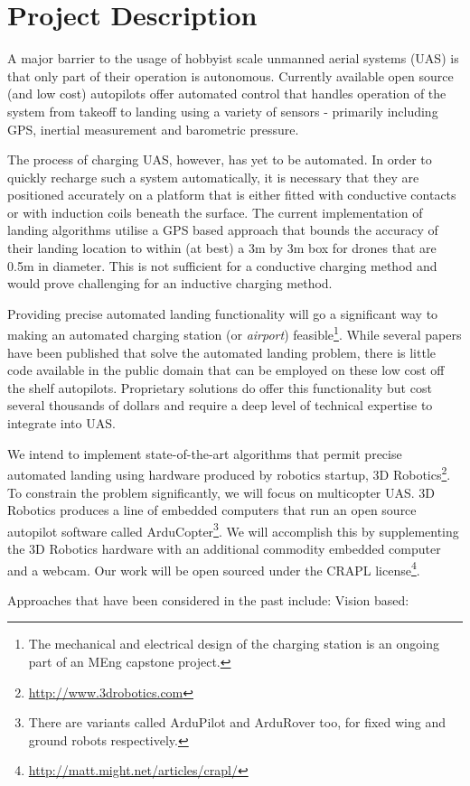 \section*{Project Description}

A major barrier to the usage of hobbyist scale unmanned aerial systems (UAS) is
that only part of their operation is autonomous. Currently available open
source (and low cost) autopilots offer  automated control that handles
operation of the system from takeoff to landing using a variety of sensors -
primarily including GPS, inertial measurement and barometric pressure. 

The process of charging UAS, however, has yet to be automated. In order to
quickly recharge such a system automatically, it is necessary that they are
positioned accurately on a platform that is either fitted with conductive
contacts or with induction coils beneath the surface. The current
implementation of landing algorithms utilise a GPS based approach that bounds
the accuracy of their landing location to within (at best) a 3m by 3m box for
drones that are 0.5m in diameter.  This is not sufficient for a conductive
charging method and would prove challenging for an inductive charging method.

Providing precise automated landing functionality will go a significant way to
making an automated charging station (or \textit{airport})
feasible\footnote{The mechanical and electrical design of the charging station
is an ongoing part of an MEng capstone project.}. While several papers have
been published that solve the automated landing problem, there is little code
available in the public domain that can be employed on these low cost off the
shelf autopilots. Proprietary solutions do offer this functionality but cost
several thousands of dollars and require a deep level of technical expertise to
integrate into UAS.

We intend to implement state-of-the-art algorithms that permit precise
automated landing using hardware produced by robotics startup, 3D
Robotics\footnote{\url{http://www.3drobotics.com}}. To constrain the problem
significantly, we will focus on multicopter UAS. 3D Robotics produces a line of
embedded computers that run an open source autopilot software called
ArduCopter\footnote{There are variants called ArduPilot and ArduRover too, for
fixed wing and ground robots respectively.}. We will accomplish this by
supplementing the 3D Robotics hardware with an additional commodity embedded
computer and a webcam. Our work will be open sourced under the CRAPL
license\footnote{\url{http://matt.might.net/articles/crapl/}}.

Approaches that have been considered in the past include:
Vision based: 
\cite{simamitra2013} 
\cite{ginkel2013} 
\cite{green2003autonomous}
\cite{merz2006autonomous}
\cite{garcia2002towards}
\cite{johnson2005vision}
\cite{saripalli2002vision}
